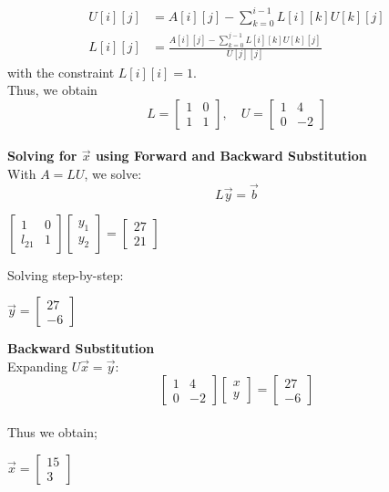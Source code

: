 \documentclass[journal]{IEEEtran}
\begin{document}
\begin{enumerate}
\begin{align}
    U[i][j] &= A[i][j] - \sum_{k=0}^{i-1} L[i][k] U[k][j] \\
    L[i][j] &= \frac{A[i][j] - \sum_{k=0}^{j-1} L[i][k] U[k][j]}{U[j][j]}
\end{align}
with the constraint \( L[i][i] = 1 \).\\
Thus, we obtain\\ \[
L =
\begin{bmatrix} 
1 & 0 \\ 
1 & 1
\end{bmatrix},
\quad
U =
\begin{bmatrix} 
1 & 4 \\ 
0 & -2
\end{bmatrix}
\]\\
\textbf{Solving for \( \Vec{x} \) using Forward and Backward Substitution}\\
With \( A = LU \), we solve:
\[
L\Vec{y} = \Vec{b}
\]
\begin{center}
    $\begin{bmatrix} 
1 & 0 \\ 
l_{21} & 1
\end{bmatrix}
\begin{bmatrix} 
y_1 \\ 
y_2
\end{bmatrix} = \begin{bmatrix} 
27 \\ 
21
\end{bmatrix}$
\end{center} 
Solving step-by-step:\\
\begin{center}
    $\Vec{y}=\begin{bmatrix} 
27 \\ 
-6
\end{bmatrix}$
\end{center}
\textbf{Backward Substitution}\\
Expanding \( U\Vec{x}= \Vec{y}\):
\[
\begin{bmatrix} 
1 & 4 \\ 
0 & -2
\end{bmatrix}
\begin{bmatrix} 
x \\ 
y
\end{bmatrix}
=
\begin{bmatrix} 
27 \\ 
-6
\end{bmatrix}
\]\\
Thus we obtain; \\
\begin{center}
    $\Vec{x}=\begin{bmatrix} 
15 \\ 
3
\end{bmatrix}$
\end{center}
\end{enumerate}
\end{document}
